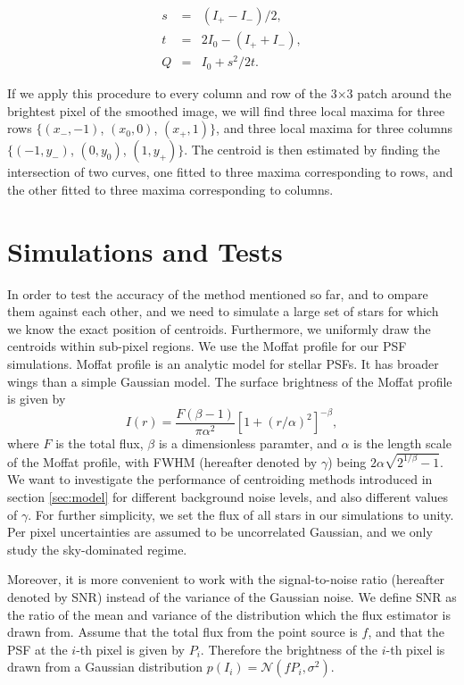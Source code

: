 \documentclass[12pt, preprint]{aastex}
\newcommand{\beq}{\begin{equation}}
\newcommand{\eeq}{\end{equation}}
\begin{document}
\begin{eqnarray}
s&=&(I_{+}-I_{-})/2, \\
t &=&2I_{0} - (I_{+}+I_{-}), \\
Q &=& I_{0} +s^{2}/2t.
\label{def}
\end{eqnarray}

If we apply this procedure to every column and row of the 3$\times$3 patch
around the brightest pixel of the smoothed image, we will find three local
maxima for three rows $\{(x_{-},-1)$, $(x_{0},0)$, $(x_{+},1)\}$, and three
local maxima for three columns $\{(-1,y_{-})$, $(0,y_{0})$, $(1,y_{+})\}$.
The centroid is then estimated by finding the intersection of two curves,
one fitted to three maxima corresponding to rows, and the other fitted
to three maxima corresponding to columns.

\section{Simulations and Tests}\label{sec:data}

In order to test the accuracy of the method mentioned so far, and to ompare them against each other,
and we need to simulate a large set of stars for which we know the exact position of centroids.
Furthermore, we uniformly draw the centroids within sub-pixel regions. 
We use the Moffat profile \citep{moffat} for our PSF simulations. 
Moffat profile is an analytic model for stellar PSFs. It has broader wings than
a simple Gaussian model. The surface brightness of the Moffat profile is given by
\beq
I(r) = \frac{F(\beta -1)}{\pi \alpha^{2}}[1+(r/\alpha)^{2}]^{-\beta},
\label{mof}
\eeq
where $F$ is the total flux, $\beta$ is a dimensionless paramter, and $\alpha$ is
the length scale of the Moffat profile, with FWHM (hereafter denoted by $\gamma$)
being $2\alpha\sqrt{2^{1/\beta}-1}$. 
We want to investigate the performance of centroiding methods introduced
in section \ref{sec:model} for different background noise levels, and also different
values of $\gamma$. For further simplicity, we set the flux of all stars in our
simulations to unity. Per pixel uncertainties are assumed to be uncorrelated Gaussian,
and we only study the sky-dominated regime.

Moreover, it is more convenient to work with the signal-to-noise ratio
(hereafter denoted by SNR) instead of the variance of the Gaussian noise.
We define SNR as the ratio of the mean and variance of the distribution
which the flux estimator is drawn from. Assume that the total flux from
the point source is $f$, and that the PSF at the $i$-th pixel is given
by $P_{i}$. Therefore the brightness of the $i$-th pixel is drawn from
a Gaussian distribution $p(I_{i}) = \mathcal{N}(fP_{i},\sigma^{2})$. 
\end{document}
